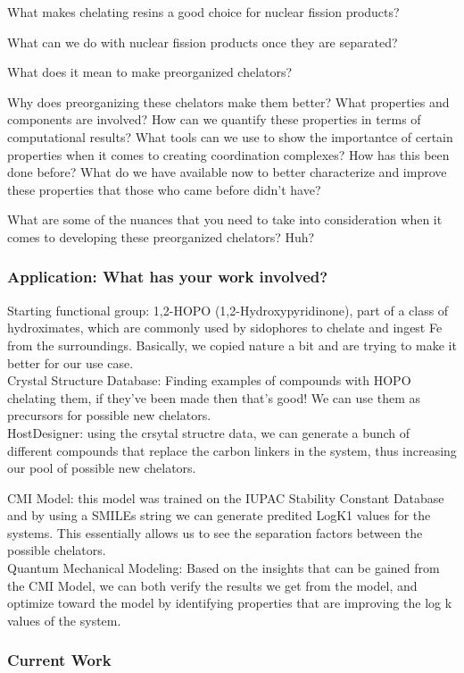 \begin{frame}
What makes chelating resins a good choice for nuclear fission products?
\end{frame}

\begin{frame}
What can we do with nuclear fission products once they are separated?
\end{frame}

\begin{frame}
What does it mean to make preorganized chelators?
\end{frame}

\begin{frame}
Why does preorganizing these chelators make them better? What properties and components are involved?
How can we quantify these properties in terms of computational results?
What tools can we use to show the importantce of certain properties when it comes to creating coordination complexes?
How has this been done before?
What do we have available now to better characterize and improve these properties that those who came before didn't have?
\end{frame}

\begin{frame}
What are some of the nuances that you need to take into consideration when it comes to developing these preorganized chelators? Huh?
\end{frame}

\begin{frame}
\frametitle{Application: What has your work involved?}
Starting functional group: 1,2-HOPO (1,2-Hydroxypyridinone), part of a class of hydroximates, which
are commonly used by sidophores to chelate and ingest Fe from the surroundings. Basically, we copied
nature a bit and are trying to make it better for our use case.\\
Crystal Structure Database: Finding examples of compounds with HOPO chelating them, if they've been
made then that's good! We can use them as precursors for possible new chelators.\\
HostDesigner: using the crsytal structre data, we can generate a bunch of different compounds that
replace the carbon linkers in the system, thus increasing our pool of possible new chelators.\\
\end{frame}
\begin{frame}
CMI Model: this model was trained on the IUPAC Stability Constant Database and by using a SMILEs
string we can generate predited LogK1 values for the systems. This essentially allows us to see the
separation factors between the possible chelators.\\
Quantum Mechanical Modeling: Based on the insights that can be gained from the CMI Model, we
can both verify the results we get from the model, and optimize toward the model by identifying
properties that are improving the log k values of the system.\\
\end{frame}


\begin{frame}
\frametitle{Current Work}
\end{frame}
